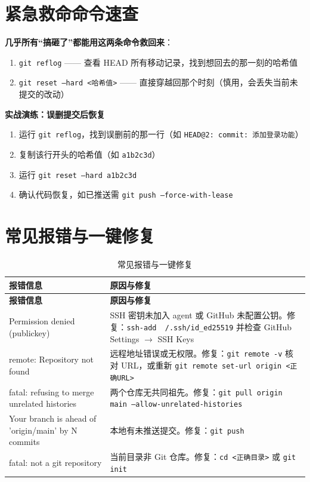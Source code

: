 \documentclass[12pt,a4paper,openany]{ctexbook}
\begin{document}
\section{紧急救命命令速查}

\medskip
\textbf{几乎所有“搞砸了”都能用这两条命令救回来}：
\begin{enumerate}[leftmargin=1.5em]
  \item \texttt{git reflog} —— 查看 HEAD 所有移动记录，找到想回去的那一刻的哈希值
  \item \texttt{git reset --hard <哈希值>} —— 直接穿越回那个时刻（慎用，会丢失当前未提交的改动）
\end{enumerate}
\medskip

\textbf{实战演练：误删提交后恢复}
\medskip
\begin{enumerate}[leftmargin=1.5em]
  \item 运行 \texttt{git reflog}，找到误删前的那一行（如 \texttt{HEAD@{2}: commit: 添加登录功能}）
  \item 复制该行开头的哈希值（如 \texttt{a1b2c3d}）
  \item 运行 \texttt{git reset --hard a1b2c3d}
  \item 确认代码恢复，如已推送需 \texttt{git push --force-with-lease}
\end{enumerate}
\medskip

\section{常见报错与一键修复}

\begin{longtable}{p{4cm} p{10cm}}
\caption{常见报错与一键修复}\label{tab:common-errors}\\
\toprule
\textbf{报错信息} & \textbf{原因与修复} \\
\midrule
\endfirsthead
\toprule
\textbf{报错信息} & \textbf{原因与修复} \\
\midrule
\endhead
Permission denied (publickey) & SSH 密钥未加入 agent 或 GitHub 未配置公钥。修复：\texttt{ssh-add ~/.ssh/id\_ed25519} 并检查 GitHub Settings $\to$ SSH Keys \\
remote: Repository not found & 远程地址错误或无权限。修复：\texttt{git remote -v} 核对 URL，或重新 \texttt{git remote set-url origin <正确URL>} \\
fatal: refusing to merge unrelated histories & 两个仓库无共同祖先。修复：\texttt{git pull origin main --allow-unrelated-histories} \\
Your branch is ahead of 'origin/main' by N commits & 本地有未推送提交。修复：\texttt{git push} \\
fatal: not a git repository & 当前目录非 Git 仓库。修复：\texttt{cd <正确目录>} 或 \texttt{git init} \\
\bottomrule
\end{longtable}
\end{document}
